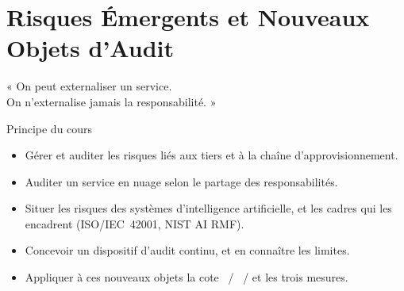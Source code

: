 
\chapter{Risques Émergents et Nouveaux Objets d'Audit}
\label{chap:emergents}

\epigraph{%
    « On peut externaliser un service.\\
    On n'externalise jamais la responsabilité. »%
}{Principe du cours}


\begin{boxobjectifs}
\begin{itemize}
    \item Gérer et auditer les risques liés aux tiers et à la chaîne
          d'approvisionnement.
    \item Auditer un service en nuage selon le partage des responsabilités.
    \item Situer les risques des systèmes d'intelligence artificielle, et les
          cadres qui les encadrent (ISO/IEC~42001, NIST AI RMF).
    \item Concevoir un dispositif d'audit continu, et en connaître les
          limites.
    \item Appliquer à ces nouveaux objets la cote \OUI{}~/ \NON{}~/ \NEK{} et
          les trois mesures.
\end{itemize}
\end{boxobjectifs}

